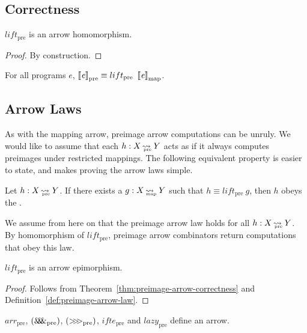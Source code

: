 \documentclass[preprint]{sigplanconf}
\newcommand{\arrow}{\rightsquigarrow}
\newcommand{\arrowlift}{\ensuremath{lift}}
\newcommand{\arrowarr}{\ensuremath{arr}}
\newcommand{\arrowcomp}{\ensuremath{{>}\mspace{-6mu}{>}\mspace{-6mu}{>}}}
\newcommand{\arrowpair}{\ensuremath{\mathit{\&\mspace{-7.5mu}\&\mspace{-7.5mu}\&}}}
\newcommand{\arrowif}{\ensuremath{ifte}}
\newcommand{\arrowlazy}{\ensuremath{lazy}}
\newcommand{\map}{_\mathrm{map}}
\DeclareMathOperator{\mapto}{\arrow_{\mspace{-21mu}\map}}
\newcommand{\pre}{_\mathrm{pre}}
\DeclareMathOperator{\preto}{\arrow_{\mspace{-19mu}\pre}}
\newcommand{\liftpre}{\arrowlift\pre}
\newcommand{\arrpre}{\arrowarr\pre}
\newcommand{\comppre}{\arrowcomp\pre}
\newcommand{\pairpre}{\arrowpair\pre}
\newcommand{\ifpre}{\arrowif\pre}
\newcommand{\lazypre}{\arrowlazy\pre}
\begin{document}
\subsection{Correctness}

\begin{theorem}
$\liftpre$ is an arrow homomorphism.
\label{thm:preimage-arrow-correctness}
\end{theorem}
\begin{proof}
By construction.
\end{proof}

\begin{corollary}
For all programs $\mathit{e}$, $\meaningof{\mathit{e}}\pre \equiv \liftpre~\meaningof{\mathit{e}}\map$.
\label{cor:preimage-arrow-correctness}
\end{corollary}

\subsection{Arrow Laws}

As with the mapping arrow, preimage arrow computations can be unruly.
We would like to assume that each $h : X \preto Y$ acts as if it always computes preimages under restricted mappings.
The following equivalent property is easier to state, and makes proving the arrow laws simple.

\begin{definition}
Let $h : X \preto Y$. If there exists a $g : X \mapto Y$ such that $h \equiv \liftpre~g$, then $h$ obeys the .
\label{def:preimage-arrow-law}
\end{definition}

We assume from here on that the preimage arrow law holds for all $h : X \preto Y$.
By homomorphism of $\liftpre$, preimage arrow combinators return computations that obey this law.

\begin{theorem}
$\liftpre$ is an arrow epimorphism.
\end{theorem}
\begin{proof}
Follows from Theorem~\ref{thm:preimage-arrow-correctness} and Definition~\ref{def:preimage-arrow-law}.
\end{proof}

\begin{corollary}
$\arrpre$, $(\pairpre)$, $(\comppre)$, $\ifpre$ and $\lazypre$ define an arrow.
\end{corollary}
\end{document}

